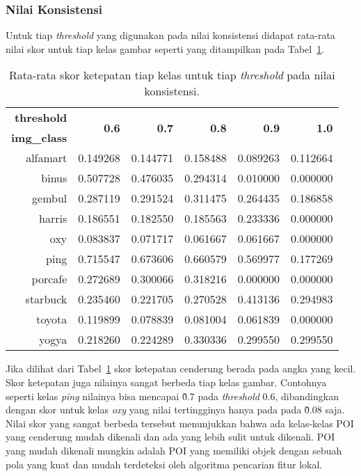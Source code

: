 \subsubsection{Nilai Konsistensi}
Untuk tiap \textit{threshold} yang digunakan pada nilai konsistensi didapat rata-rata nilai skor untuk tiap kelas gambar seperti yang ditampilkan pada Tabel~\ref{tab:rata_kelas_konsistensi}. 
\begin{table}[H]
	\centering
	\begin{tabular}{|r|r|r|r|r|r|}
		\hline
		\textbf{threshold}  & \multirow{2}{*}{\textbf{0.6}} & \multirow{2}{*}{\textbf{0.7}} & \multirow{2}{*}{\textbf{0.8}} & \multirow{2}{*}{\textbf{0.9}} & \multirow{2}{*}{\textbf{1.0}} \\ \cline{1-1}
		\textbf{img\_class}  &       &       &       &       &          \\ \hline
		alfamart & 0.149268 & 0.144771 & 0.158488 & 0.089263 & 0.112664 \\ \hline
		binus    & 0.507728 & 0.476035 & 0.294314 & 0.010000 & 0.000000 \\ \hline
		gembul   & 0.287119 & 0.291524 & 0.311475 & 0.264435 & 0.186858 \\ \hline
		harris   & 0.186551 & 0.182550 & 0.185563 & 0.233336 & 0.000000 \\ \hline
		oxy      & 0.083837 & 0.071717 & 0.061667 & 0.061667 & 0.000000 \\ \hline
		ping     & 0.715547 & 0.673606 & 0.660579 & 0.569977 & 0.177269 \\ \hline
		porcafe  & 0.272689 & 0.300066 & 0.318216 & 0.000000 & 0.000000 \\ \hline
		starbuck & 0.235460 & 0.221705 & 0.270528 & 0.413136 & 0.294983 \\ \hline
		toyota   & 0.119899 & 0.078839 & 0.081004 & 0.061839 & 0.000000 \\ \hline
		yogya    & 0.218260 & 0.224289 & 0.330336 & 0.299550 & 0.299550 \\ \hline
	\end{tabular}
	\caption{Rata-rata skor ketepatan tiap kelas untuk tiap \textit{threshold} pada nilai konsistensi.}
	\label{tab:rata_kelas_konsistensi}
\end{table}
Jika dilihat dari Tabel~\ref{tab:rata_kelas_konsistensi} skor ketepatan cenderung berada pada angka yang kecil. Skor ketepatan juga nilainya sangat berbeda tiap kelas gambar. Contohnya seperti kelas \textit{ping} nilainya bisa mencapai \~0.7 pada \textit{threshold} 0.6, dibandingkan dengan skor untuk kelas \textit{oxy} yang nilai tertingginya hanya pada pada \~0.08 saja. Nilai skor yang sangat berbeda tersebut menunjukkan bahwa ada kelas-kelas POI yang cenderung mudah dikenali dan ada yang lebih sulit untuk dikenali. POI yang mudah dikenali mungkin adalah POI yang memiliki objek dengan sebuah pola yang kuat dan mudah terdeteksi oleh algoritma pencarian fitur lokal.

